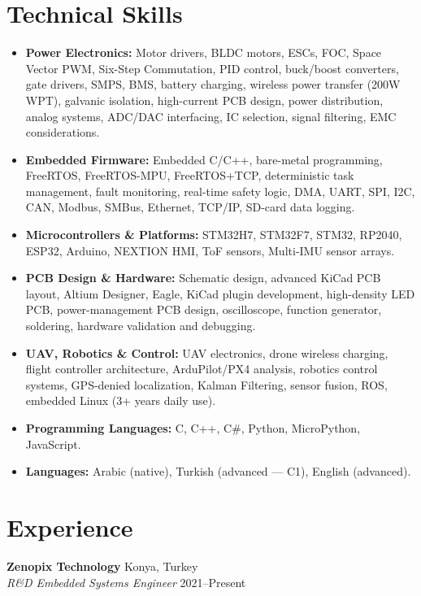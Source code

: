 \documentclass[a4paper,10pt]{article}
\begin{document}
\section*{Technical Skills}
\begin{itemize}
  \item \textbf{Power Electronics:} Motor drivers, BLDC motors, ESCs, FOC, Space Vector PWM,
        Six-Step Commutation, PID control, buck/boost converters, gate drivers, SMPS, BMS,
        battery charging, wireless power transfer (200W WPT), galvanic isolation,
        high-current PCB design, power distribution, analog systems, ADC/DAC interfacing,
        IC selection, signal filtering, EMC considerations.
  \item \textbf{Embedded Firmware:} Embedded C/C++, bare-metal programming, FreeRTOS,
        FreeRTOS-MPU, FreeRTOS+TCP, deterministic task management, fault monitoring,
        real-time safety logic, DMA, UART, SPI, I2C, CAN, Modbus, SMBus, Ethernet,
        TCP/IP, SD-card data logging.
  \item \textbf{Microcontrollers \& Platforms:} STM32H7, STM32F7, STM32, RP2040, ESP32,
        Arduino, NEXTION HMI, ToF sensors, Multi-IMU sensor arrays.
  \item \textbf{PCB Design \& Hardware:} Schematic design, advanced KiCad PCB layout,
        Altium Designer, Eagle, KiCad plugin development, high-density LED PCB,
        power-management PCB design, oscilloscope, function generator, soldering,
        hardware validation and debugging.
  \item \textbf{UAV, Robotics \& Control:} UAV electronics, drone wireless charging,
        flight controller architecture, ArduPilot/PX4 analysis, robotics control systems,
        GPS-denied localization, Kalman Filtering, sensor fusion, ROS,
        embedded Linux (3+ years daily use).
  \item \textbf{Programming Languages:} C, C++, C\#, Python, MicroPython, JavaScript.
  \item \textbf{Languages:} Arabic (native), Turkish (advanced --- C1), English (advanced).
\end{itemize}

\section*{Experience}
\textbf{Zenopix Technology} \hfill Konya, Turkey\\
\textit{R\&D Embedded Systems Engineer} \hfill 2021--Present
\end{document}
